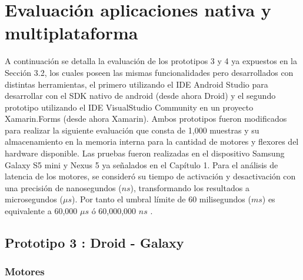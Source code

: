 \section{Evaluación aplicaciones nativa y multiplataforma}

A continuación se detalla la evaluación de los prototipos 3 y 4 ya expuestos en la Sección 3.2, los cuales poseen las mismas funcionalidades pero desarrollados con distintas herramientas, el primero utilizando el IDE Android Studio para desarrollar con el SDK nativo de android (desde ahora Droid) y el segundo prototipo utilizando el IDE VisualStudio Community en un proyecto Xamarin.Forms (desde ahora Xamarin). Ambos prototipos fueron modificados para realizar la siguiente evaluación que consta de 1,000 muestras y su almacenamiento en la memoria interna para la cantidad de motores y flexores del hardware disponible. Las pruebas fueron realizadas en el dispositivo Samsung Galaxy S5 mini y Nexus 5 ya señalados en el Capítulo 1. Para el análisis de latencia de los motores, se consideró su tiempo de activación y desactivación con una precisión de nanosegundos ($ns$), transformando los resultados a microsegundos ($\mu s$).  Por tanto el umbral límite de 60 milisegundos ($ms$) es equivalente a 60,000 $\mu s$ ó 60,000,000 $ns$ .

\subsection{Prototipo 3 : Droid - Galaxy}

\subsubsection{Motores}

